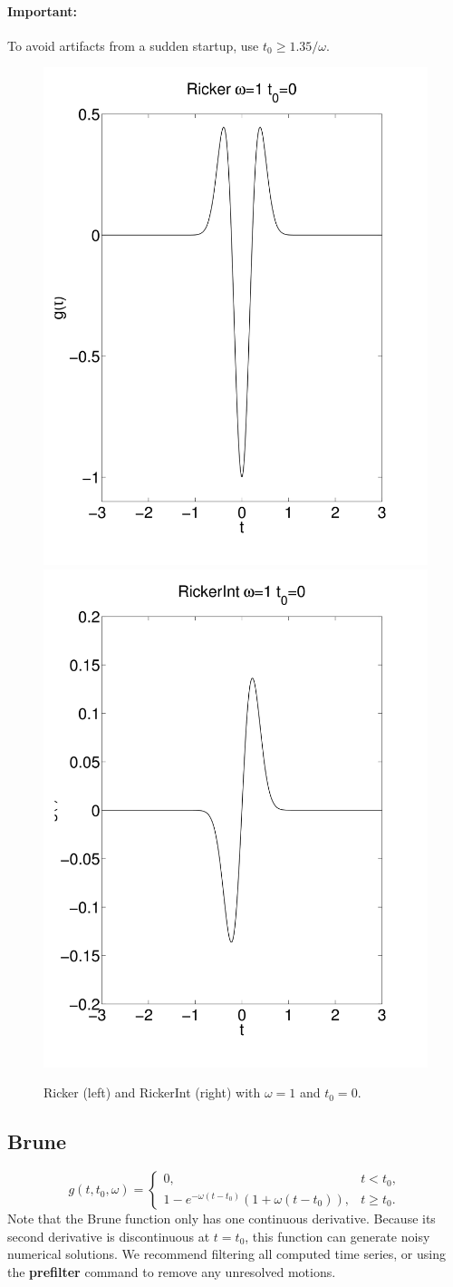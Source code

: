 \documentclass[11pt]{report}
\begin{document}
\paragraph{Important:} To avoid artifacts from a sudden startup, use
$t_0 \geq 1.35/\omega$.
\begin{figure}
\begin{centering}
  \includegraphics[width=0.4\linewidth]{figures/f3-ricker.png}
  \includegraphics[width=0.4\linewidth]{figures/f4-rickerint.png}
  \caption{Ricker (left) and RickerInt (right) with $\omega=1$ and $t_0=0$.}
  \label{fig:rickers}
\end{centering}
\end{figure}  
%
\subsection{Brune} 
 \label{brune}
\[
 g(t,t_0,\omega) = \left\{
\begin{array}{ll} 
0, & t < t_0, \\ 
1 - e^{-\omega(t-t_0)}( 1+\omega(t-t_0) ), & t \geq t_0.
\end{array}
\right.
\]
Note that the Brune function only has one continuous derivative. Because its second derivative is discontinuous at
$t=t_0$, this function can generate noisy numerical solutions. We recommend filtering all computed time
series, or using the {\bf prefilter} command to remove any unresolved motions.
\end{document}
